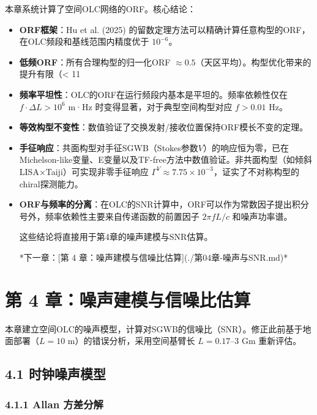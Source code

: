 \documentclass[12pt,a4paper]{article}
\begin{document}
本章系统计算了空间OLC网络的ORF。核心结论：

\begin{itemize}
  \item[1] \textbf{ORF框架}：Hu et al. (2025) 的留数定理方法可以精确计算任意构型的ORF，在OLC频段和基线范围内精度优于 $10^{-6}$。

  \item[2] \textbf{低频ORF}：所有合理构型的归一化ORF $\approx 0.5$（天区平均）。构型优化带来的提升有限（< 11%

  \item[3] \textbf{频率平坦性}：OLC的ORF在运行频段内基本是平坦的。频率依赖性仅在 $f \cdot \Delta L > 10^6$ m·Hz 时变得显著，对于典型空间构型对应 $f > 0.01$ Hz。

  \item[4] \textbf{等效构型不变性}：数值验证了交换发射/接收位置保持ORF模长不变的定理。

  \item[5] \textbf{手征响应}：共面构型对手征SGWB（Stokes参数$V$）的响应恒为零，已在Michelson-like变量、E变量以及TF-free方法中数值验证。非共面构型（如倾斜LISA×Taiji）可实现非零手征响应 $\Gamma^V \approx 7.75\times 10^{-3}$，证实了不对称构型的chiral探测能力。

  \item[6] \textbf{ORF与频率的分离}：在OLC的SNR计算中，ORF可以作为常数因子提出积分号外，频率依赖性主要来自传递函数的前置因子 $2\pi f L/c$ 和噪声功率谱。

这些结论将直接用于第4章的噪声建模与SNR估算。


*下一章：[第 4 章：噪声建模与信噪比估算](./第04章-噪声与SNR.md)*

\end{itemize}
\section{第 4 章：噪声建模与信噪比估算}


本章建立空间OLC的噪声模型，计算对SGWB的信噪比（SNR）。修正此前基于地面部署（$L = 10$ m）的错误分析，采用空间基臂长 $L = 0.17$–3 Gm 重新评估。

\subsection{4.1 时钟噪声模型}


\subsubsection{4.1.1 Allan 方差分解}
\end{document}
